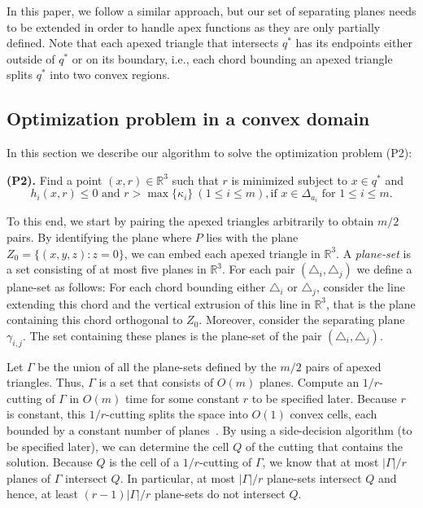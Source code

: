 \documentclass[a4paper,UKenglish]{lipics}
\begin{document}
In this paper, we follow a similar approach, but our set of separating planes needs to be extended in order to handle apex functions as they are only partially defined.
Note that each apexed triangle that intersects $q^*$ has its endpoints either outside of $q^*$ or on its boundary, i.e., each chord bounding an apexed triangle splits $q^*$ into two convex regions.

\subsection{Optimization problem in a convex domain}
In this section we describe our algorithm to solve the optimization problem (P2):

\textbf{(P2).} Find a point $(x,r)\in \mathbb{R}^3$ such that $r$ is minimized subject to $x\in q^*$ and 
$$h_i(x, r) \leq 0 \text{ and } r > \max\{\kappa_i\}\ (1\leq i\leq m), \text{if $x\in \Delta_{a_i}$ for $1\leq i \leq m$}.$$

To this end, we start by pairing the apexed triangles arbitrarily to obtain $m/2$ pairs.
By identifying the plane where $P$ lies with the plane $Z_0 = \{(x,y,z): z = 0\}$, we can embed each apexed triangle in $\mathbb{R}^3$.
A \emph{plane-set} is a set consisting of at most five planes in $\mathbb{R}^3$.
For each pair $(\triangle_i, \triangle_j)$ we define a plane-set as follows: 
For each chord bounding either $\triangle_i$ or $\triangle_j$, consider the line extending this chord and the vertical extrusion of this line in $\mathbb{R}^3$, that is the plane containing this chord orthogonal to $Z_0$. Moreover, consider the separating plane~$\gamma_{i,j}$. The set containing these planes is the plane-set of the pair $(\triangle_i, \triangle_j)$.

Let $\Gamma$ be the union of all the plane-sets defined by the $m/2$ pairs of apexed triangles. Thus, $\Gamma$ is a set that consists of $O(m)$ planes. Compute an $1/r$-cutting of $\Gamma$ in $O(m)$ time for some constant $r$ to be specified later.
Because $r$ is constant, this $1/r$-cutting splits the space into $O(1)$ convex cells, each bounded by a constant number of planes~\cite{matousekCuttings}. 
By using a side-decision algorithm (to be specified later), we can determine the cell $Q$ of the cutting that contains the solution. Because $Q$ is the cell of a $1/r$-cutting of $\Gamma$, we know that at most $|\Gamma|/r$ planes of $\Gamma$ intersect $Q$. In particular, at most $|\Gamma|/r$ plane-sets intersect $Q$ and hence, at least $(r-1)|\Gamma|/r$ plane-sets do not intersect $Q$. 
\end{document}
